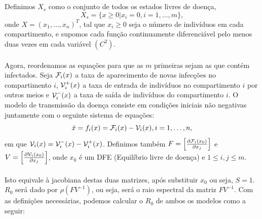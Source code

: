 \documentclass[12pt]{article}
\begin{document}
\\\\
Definimos $X_s$ como o conjunto de todos os estados livres de doença, 
$$X_s=\{x \geq 0|x_i=0, i=1,\ldots,m\},$$
onde $X=(x_1,\ldots, x_n)^T$, tal que $x_i\geq 0$ seja o número de indivíduos em cada compartimento, e supomos cada função continuamente diferenciável pelo menos duas vezes em cada variável $(C^2)$.
\\\\
Agora, reordenamos as equações para que as $m$ primeiras sejam as que contém infectados. Seja ${\cal F}_i(x)$ a taxa de aparecimento de novas infecções no compartimento $i$, ${\cal V}_i^+(x)$ a taxa de entrada de indivíduos no compartimento $i$ por outros meios e ${\cal V}_i^-(x)$ a taxa de saída de indivíduos do compartimento $i$. O modelo de transmissão da doença consiste em condições iniciais não negativas juntamente com o seguinte sistema de equações:
$$\dot{x}=f_i(x)={\cal F}_i(x)-{\cal V}_i(x), i=1,\ldots, n,$$
em que ${\cal V}_i (x) = {\cal V}_i^{-}(x) - {\cal V}_i^+(x)$. Definimos também $F=\left[\frac{\partial {\cal F}_i (x_0)}{\partial x_j}\right]$ e $V=\left[\frac{\partial {\cal V}_i (x_0) }{\partial x_j}\right]$, onde $x_0$ é um DFE (Equilíbrio livre de doença) e $1\leq i,j \leq m$. 
\\\\
Isto equivale à jacobiana  destas duas matrizes, após substituir $x_0$ ou seja, $S=1$. $R_0$ será dado por $\rho(FV^{-1})$, ou seja, será o raio espectral da matriz $FV^{-1}$. Com as definições necessárias, podemos calcular o $R_0$ de ambos os modelos como a seguir:
\end{document}
